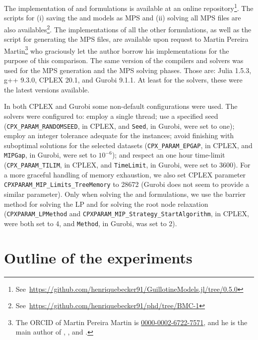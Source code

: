 The implementation of {\modelBecker} and {\modelFMT} formulations is available at an online repository\footnote{See~\url{https://github.com/henriquebecker91/GuillotineModels.jl/tree/0.5.0}}.
The scripts for (i) saving the {\modelBecker} and {\modelFMT} models as MPS and (ii) solving all MPS files are also availables\footnote{See~\url{https://github.com/henriquebecker91/phd/tree/BMC-1}}.
The implementations of all the other formulations, as well as the script for generating the MPS files, are available upon request to Martin Pereira Martin\footnote{The ORCID of Martin Pereira Martin is \href{https://orcid.org/0000-0002-6722-7571}{0000-0002-6722-7571}, and he is the main author of \citet{martin:2020}, \citet{martin:2020:bottom}, and \citet{martin:2020:top}.} who graciously let the author borrow his implementations for the purpose of this comparison. %
The same version of the compilers and solvers was used for the MPS generation and the MPS solving phases.
Those are: Julia 1.5.3, g++ 9.3.0, CPLEX 20.1, and Gurobi 9.1.1.
At least for the solvers, these were the latest versions available.

In both CPLEX and Gurobi some non-default configurations were used.
The solvers were configured to:
employ a single thread;
use a specified seed (\texttt{CPX\_PARAM\_RANDOMSEED}, in CPLEX, and \texttt{Seed}, in Gurobi, were set to one);
employ an integer tolerance adequate for the instances; avoid finishing with suboptimal solutions for the selected datasets (\texttt{CPX\_PARAM\_EPGAP}, in CPLEX, and \texttt{MIPGap}, in Gurobi, were set to \(10^{-6}\));
and respect an one hour time-limit (\texttt{CPX\_PARAM\_TILIM}, in CPLEX, and \texttt{TimeLimit}, in Gurobi, were set to 3600). For a more graceful handling of memory exhaustion, we also set CPLEX parameter \texttt{CPXPARAM\_MIP\_Limits\_TreeMemory} to 28672 (Gurobi does not seem to provide a similar parameter).
Only when solving the {\modelFMT} and {\modelBecker} formulations, we use the barrier method for solving the LP and for solving the root node relaxation (\texttt{CPXPARAM\_LPMethod} and \texttt{CPXPARAM\_MIP\_Strategy\_StartAlgorithm}, in CPLEX, were both set to 4, and \texttt{Method}, in Gurobi, was set to 2).

\section{Outline of the experiments}
\label{sec:outine_experiments_other_formulations}


